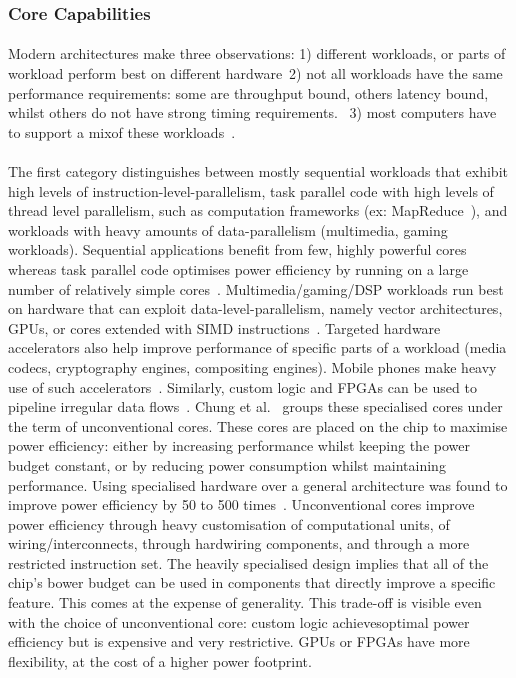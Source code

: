 \subsubsection{Core Capabilities}
\paragraph{} Modern architectures make three observations: 1) different workloads,
or parts of workload perform best on different hardware~\cite{5695539}2) not all
workloads have the same performance requirements: some are throughput
bound, others latency bound, whilst others do not have strong timing requirements.~\cite{greenhalgh2011biglittle}
3) most computers have to support a mixof these workloads~\cite{Kumar:2004:SHM:998680.1006707}.

\paragraph{} The first category distinguishes between mostly sequential workloads that exhibit high levels of instruction-level-parallelism, task parallel code with high levels of thread level parallelism, such as computation frameworks
(ex: MapReduce~\cite{dean2004mapreduce}), and workloads with heavy amounts of data-parallelism (multimedia, gaming workloads). Sequential applications benefit from few, highly powerful cores whereas task parallel code optimises power efficiency by running on a large number of relatively simple cores~\cite{Kumar:2005:HCM:1100859.1100890}. Multimedia/gaming/DSP workloads run best on hardware that can exploit data-level-parallelism, namely vector architectures, GPUs, or cores extended with SIMD instructions~\cite{Rossbach:2013:DCR:2517349.2522715}. Targeted hardware accelerators also help improve performance of specific parts of a workload (media codecs, cryptography engines, compositing engines)\cite{borkar2011future}. Mobile phones make 
heavy use of such accelerators~\cite{borkar2011future}. Similarly, custom logic and FPGAs can be used to pipeline irregular data flows~\cite{5695539}.
Chung et al.~\cite{5695539} groups these specialised cores under the term of unconventional cores. These cores are placed on the chip to maximise power efficiency: 
either by increasing performance whilst keeping the power budget constant,
or by reducing power consumption whilst maintaining performance. Using specialised hardware over a general architecture was found to improve power efficiency by 50 to 500 times~\cite{borkar2011future}.
Unconventional cores improve power efficiency through heavy customisation of computational units, of wiring/interconnects, through hardwiring components, and through a more restricted instruction set. The heavily specialised design implies that all of the chip's bower budget can be used in components that directly improve a specific feature. This comes at the expense of generality. This trade-off is visible even with the choice of unconventional core: custom logic achievesoptimal power efficiency but is expensive and very restrictive. GPUs or FPGAs have more flexibility, at the cost of a higher power footprint.  

